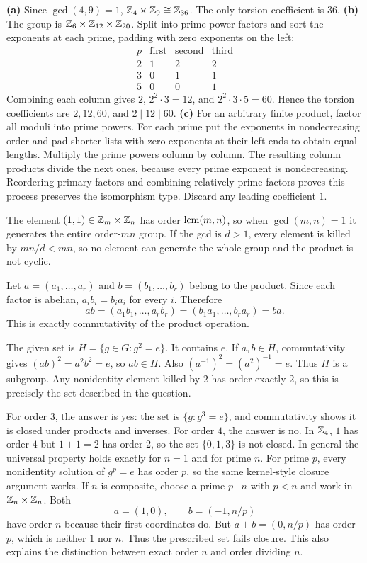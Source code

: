 \textbf{(a)} Since $\gcd(4,9)=1$, $\mathbb{Z}_4\times\mathbb{Z}_9\cong\mathbb{Z}_{36}$. The only torsion coefficient is $36$.
\textbf{(b)} The group is $\mathbb{Z}_6\times\mathbb{Z}_{12}\times\mathbb{Z}_{20}$. Split into prime-power factors and sort the exponents at each prime, padding with zero exponents on the left:
\[\begin{array}{c|ccc}p&\text{first}&\text{second}&\text{third}\\\hline2&1&2&2\\3&0&1&1\\5&0&0&1\end{array}\]
Combining each column gives $2$, $2^2\cdot3=12$, and $2^2\cdot3\cdot5=60$. Hence the torsion coefficients are $2,12,60$, and $2\mid12\mid60$.
\textbf{(c)} For an arbitrary finite product, factor all moduli into prime powers. For each prime put the exponents in nondecreasing order and pad shorter lists with zero exponents at their left ends to obtain equal lengths. Multiply the prime powers column by column. The resulting column products divide the next ones, because every prime exponent is nondecreasing. Reordering primary factors and combining relatively prime factors proves this process preserves the isomorphism type. Discard any leading coefficient $1$.

The element $(1,1)\in\mathbb{Z}_m\times\mathbb{Z}_n$ has order $\operatorname{lcm}(m,n)$, so when $\gcd(m,n)=1$ it generates the entire order-$mn$ group. If the gcd is $d>1$, every element is killed by $mn/d<mn$, so no element can generate the whole group and the product is not cyclic.

Let $a=(a_1,\ldots,a_r)$ and $b=(b_1,\ldots,b_r)$ belong to the product. Since each factor is abelian, $a_ib_i=b_ia_i$ for every $i$. Therefore
\[ab=(a_1b_1,\ldots,a_rb_r)=(b_1a_1,\ldots,b_ra_r)=ba.\]
This is exactly commutativity of the product operation.

The given set is $H=\{g\in G:g^2=e\}$. It contains $e$. If $a,b\in H$, commutativity gives $(ab)^2=a^2b^2=e$, so $ab\in H$. Also $(a^{-1})^2=(a^2)^{-1}=e$. Thus $H$ is a subgroup. Any nonidentity element killed by $2$ has order exactly $2$, so this is precisely the set described in the question.

For order $3$, the answer is yes: the set is $\{g:g^3=e\}$, and commutativity shows it is closed under products and inverses. For order $4$, the answer is no. In $\mathbb{Z}_4$, $1$ has order $4$ but $1+1=2$ has order $2$, so the set $\{0,1,3\}$ is not closed.
In general the universal property holds exactly for $n=1$ and for prime $n$. For prime $p$, every nonidentity solution of $g^p=e$ has order $p$, so the same kernel-style closure argument works. If $n$ is composite, choose a prime $p\mid n$ with $p<n$ and work in $\mathbb{Z}_n\times\mathbb{Z}_n$. Both
\[a=(1,0),\qquad b=(-1,n/p)\]
have order $n$ because their first coordinates do. But $a+b=(0,n/p)$ has order $p$, which is neither $1$ nor $n$. Thus the prescribed set fails closure. This also explains the distinction between exact order $n$ and order dividing $n$.

